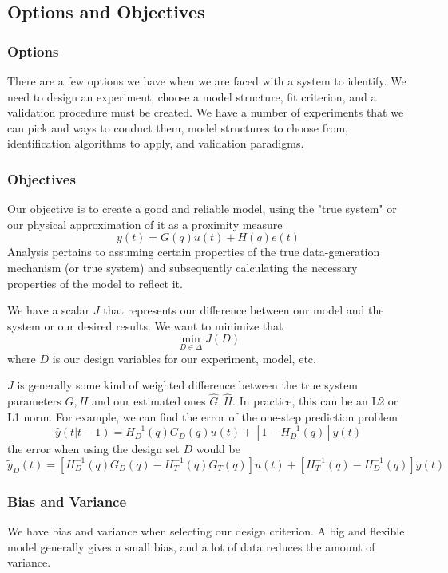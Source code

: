 \subsection{Options and Objectives}
\subsubsection{Options}
There are a few options we have when we are faced with a system to identify.
We need to design an experiment, choose a model structure, fit criterion, and a validation procedure must be created.
We have a number of experiments that we can pick and ways to conduct them, model structures to choose from, identification algorithms to apply, and validation paradigms.
\subsubsection{Objectives}
Our objective is to create a good and reliable model, using the "true system" or our physical approximation of it as a proximity measure
\begin{equation}
    y(t) = G(q) u(t) + H(q) e(t)
\end{equation}
Analysis pertains to assuming certain properties of the true data-generation mechanism (or true system) and subsequently calculating the necessary properties of the model to reflect it.

We have a scalar $J$ that represents our difference between our model and the system or our desired results.
We want to minimize that
\begin{equation}
    \min_{D \in \Delta} J(D)
\end{equation}
where $D$ is our design variables for our experiment, model, etc.

$J$ is generally some kind of weighted difference between the true system parameters $G,H$ and our estimated ones $\hat{G}, \hat{H}$.
In practice, this can be an L2 or L1 norm.
For example, we can find the error of the one-step prediction problem
\begin{equation}
    \hat{y}(t|t-1) = H_D^{-1} (q) G_D(q) u(t) + [1-H_D^{-1}(q)] y(t)
\end{equation}
the error when using the design set $D$ would be 
\begin{equation}
    \tilde{y}_D(t) =  [H_D^{-1} (q) G_D(q) - H_T^{-1}(q) G_T(q)] u(t) + [H_T^{-1}(q) -H_D^{-1}(q) ] y(t)
\end{equation}
\subsubsection{Bias and Variance}
We have bias and variance when selecting our design criterion.
A big and flexible model generally gives a small bias, and a lot of data reduces the amount of variance.

